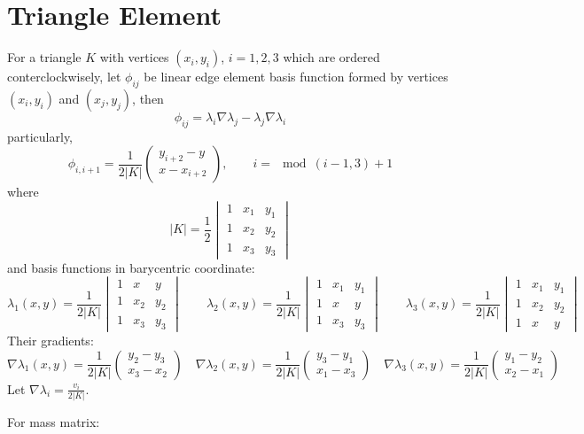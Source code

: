 \documentclass[12pt,reqno]{amsart}
\numberwithin{equation}{section}
\begin{document}
\section{Triangle Element}
For a triangle $ K $ with vertices $ (x_i,y_i) $, $ i=1,2,3 $ which are ordered conterclockwisely, let $ \phi_{ij} $ be linear edge element basis function formed by vertices $ (x_i,y_i) $ and $ (x_j,y_j) $, then
\[
\phi_{ij}=\lambda_i\nabla\lambda_j-\lambda_j\nabla\lambda_i
\]
particularly,
\[
\phi_{i,i+1}=
\frac{1}{2|K|}\begin{pmatrix}
y_{i+2}-y\\
x-x_{i+2}
\end{pmatrix},\qquad i=\mod(i-1,3)+1
\]
where 
\[
|K|=\frac{1}{2}
\begin{vmatrix}
1	&	x_1	&	y_1\\
1	&	x_2	&	y_2\\
1	&	x_3	&	y_3
\end{vmatrix}
\]
and basis functions in barycentric coordinate:
\[
\lambda_1(x,y)=\frac{1}{2|K|}
\begin{vmatrix}
1	&	x	&	y\\
1	&	x_2	&	y_2\\
1	&	x_3	&	y_3
\end{vmatrix}\qquad
\lambda_2(x,y)=\frac{1}{2|K|}
\begin{vmatrix}
1	&	x_1	&	y_1\\
1	&	x	&	y\\
1	&	x_3	&	y_3
\end{vmatrix}\qquad
\lambda_3(x,y)=\frac{1}{2|K|}
\begin{vmatrix}
1	&	x_1	&	y_1\\
1	&	x_2	&	y_2\\
1	&	x	&	y
\end{vmatrix}
\]
Their gradients:
\[
\nabla\lambda_1(x,y)=\frac{1}{2|K|}
\begin{pmatrix}
y_2-y_3\\
x_3-x_2
\end{pmatrix}\quad
\nabla\lambda_2(x,y)=\frac{1}{2|K|}
\begin{pmatrix}
y_3-y_1\\
x_1-x_3
\end{pmatrix}\quad
\nabla\lambda_3(x,y)=\frac{1}{2|K|}
\begin{pmatrix}
y_1-y_2\\
x_2-x_1
\end{pmatrix}
\]
Let $ \nabla\lambda_i=\frac{v_i}{2|K|} $.

For mass matrix:
\end{document}
